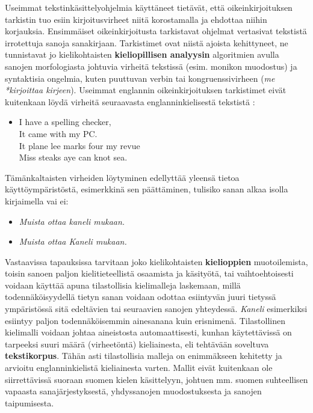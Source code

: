 \begin{multicols}{2}
Useimmat tekstinkäsittelyohjelmia käyttäneet tietävät, että oikeinkirjoituksen tarkistin tuo esiin kirjoitusvirheet niitä korostamalla ja ehdottaa niihin korjauksia. Ensimmäiset oikeinkirjoitusta tarkistavat ohjelmat vertasivat tekstistä irrotettuja sanoja sanakirjaan. Tarkistimet ovat niistä ajoista kehittyneet, ne tunnistavat jo kielikohtaisten \textbf{kieliopillisen analyysin} algoritmien avulla sanojen morfologiasta johtuvia virheitä tekstissä (esim. monikon muodostus) ja syntaktisia ongelmia, kuten puuttuvan verbin tai kongruenssivirheen (\textit{me *kirjoittaa kirjeen}). Useimmat englannin oikeinkirjoituksen tarkistimet eivät kuitenkaan löydä virheitä seuraavasta englanninkielisestä tekstistä \cite{Surprise}:

\begin{itemize}
\item[] I have a spelling checker,\\
  It came with my PC.\\
  It plane lee marks four my revue\\
  Miss steaks aye can knot sea.
\end{itemize}

Tämänkaltaisten virheiden löytyminen edellyttää yleensä tietoa käyttöympäristöstä, esimerkkinä sen päättäminen, tulisiko sanan alkaa isolla kirjaimella vai ei:

\begin{itemize}
\item[] \textit{Muista ottaa kaneli mukaan.}
\item[] \textit{Muista ottaa Kaneli mukaan.}
\end{itemize}

Vastaavissa tapauksissa tarvitaan joko kielikohtaisten \textbf{kielioppien} muotoilemista, toisin sanoen paljon kielitieteellistä osaamista ja käsityötä, tai vaihtoehtoisesti voidaan käyttää apuna tilastollisia kielimalleja laskemaan, millä todennäköisyydellä tietyn sanan voidaan odottaa esiintyvän juuri tietyssä ympäristössä sitä edeltävien tai seuraavien sanojen yhteydessä. \textit{Kaneli} esimerkiksi esiintyy paljon todennäköisemmin ainesanana kuin erisnimenä. Tilastollinen kielimalli voidaan johtaa aineistosta automaattisesti, kunhan käytettävissä on tarpeeksi suuri määrä (virheetöntä) kieliainesta, eli tehtävään soveltuva \textbf{tekstikorpus}. Tähän asti tilastollisia malleja on enimmäkseen kehitetty ja arvioitu englanninkielistä kieliainesta varten. Mallit eivät kuitenkaan ole siirrettävissä suoraan suomen kielen käsittelyyn, johtuen mm.  suomen suhteellisen vapaasta sanajärjestyksestä, yhdyssanojen muodostuksesta ja sanojen taipumisesta.


\end{multicols}
